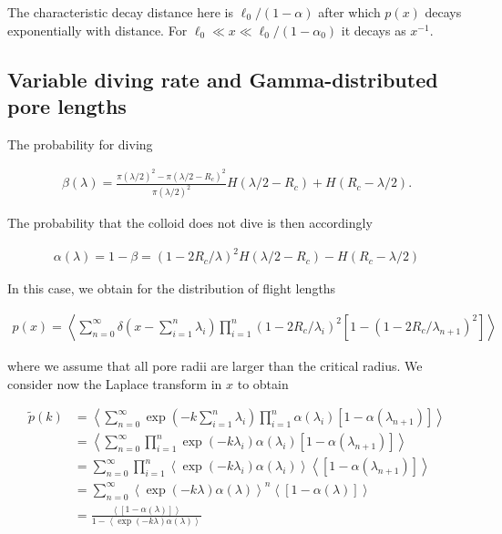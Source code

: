 \documentclass[singlecolumn,pre,notitlepage,preprintnumbers,floatfix,superscriptaddress]{revtex4-1}
\begin{document}
The characteristic decay distance here is $\ell_0/(1 - \alpha)$ after which $p(x)$ decays exponentially with distance. For $\ell_0 \ll x \ll \ell_0/(1 - \alpha_0)$ it decays as $x^{-1}$.

\subsection{Variable diving rate and Gamma-distributed pore lengths}

The probability for diving

\begin{align}
\beta(\lambda) = \frac{\pi (\lambda/2)^2 - \pi (\lambda/2-R_c)^2}{\pi (\lambda/2)^2}
H(\lambda/2 - R_c) + H(R_c - \lambda/2).
\end{align}

The probability that the colloid does not dive is then accordingly

\begin{align}
\alpha(\lambda) = 1 - \beta = (1-2 R_c/\lambda)^2
H(\lambda/2 - R_c)  - H(R_c - \lambda/2)
\end{align}

In this case, we obtain for the distribution of flight lengths

\begin{align}
p(x) = \left\langle \sum\limits_{n = 0}^\infty \delta\left(x - \sum\limits_{i = 1}^n \lambda_i\right) \prod\limits_{i = 1}^n (1-2 R_c/\lambda_i)^2
[1 - (1-2 R_c/\lambda_{n+1})^2] \right\rangle
\end{align}

where we assume that all pore radii are larger than the critical radius. We consider now the Laplace transform in $x$ to obtain

\begin{align}
\widetilde p(k) &= \left\langle \sum\limits_{n = 0}^\infty \exp\left(- k \sum\limits_{i = 1}^n \lambda_i\right) \prod\limits_{i = 1}^n \alpha(\lambda_i)
[1 - \alpha(\lambda_{n+1})] \right\rangle
\nonumber\\
&= \left\langle \sum\limits_{n = 0}^\infty \prod\limits_{i = 1}^n \exp\left(- k \lambda_i\right)  \alpha(\lambda_i)
[1 - \alpha(\lambda_{n+1})] \right\rangle
\nonumber\\
&= \sum\limits_{n = 0}^\infty \prod\limits_{i = 1}^n \left\langle \exp\left(- k
\lambda_i\right) \alpha(\lambda_i) \right\rangle
\left\langle [1 - \alpha(\lambda_{n+1})] \right\rangle
\nonumber\\
&= \sum\limits_{n = 0}^\infty \left\langle \exp\left(- k
\lambda\right) \alpha(\lambda) \right\rangle^n
\left\langle [1 - \alpha(\lambda)] \right\rangle
\nonumber\\
&= \frac{\left\langle [1 - \alpha(\lambda)] \right\rangle}{1 - \left\langle \exp\left(- k
\lambda\right)  \alpha(\lambda)\right\rangle}
\end{align}
\end{document}
